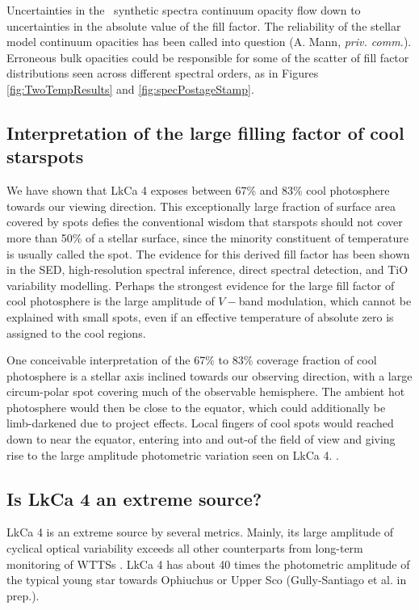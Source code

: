 \documentclass[twocolumn]{emulateapj}%
\newcommand{\name}{LkCa 4 }
\begin{document}
Uncertainties in the \PHOENIX\ synthetic spectra continuum opacity flow down to uncertainties in the absolute value of the fill factor.  The reliability of the stellar model continuum opacities has been called into question (A. Mann, \emph{priv. comm.}).  Erroneous bulk opacities could be responsible for some of the scatter of fill factor distributions seen across different spectral orders, as in Figures \ref{fig:TwoTempResults} and \ref{fig:specPostageStamp}.


\subsection{Interpretation of the large filling factor of cool starspots}
We have shown that LkCa 4 exposes between 67\% and 83\% cool photosphere towards our viewing direction.  This exceptionally large fraction of surface area covered by spots defies the conventional wisdom that starspots should not cover more than 50\% of a stellar surface, since the minority constituent of temperature is usually called the spot.  The evidence for this derived fill factor has been shown in the SED, high-resolution spectral inference, direct spectral detection, and TiO variability modelling.  Perhaps the strongest evidence for the large fill factor of cool photosphere is the large amplitude of $V-$band modulation, which cannot be explained with small spots, even if an effective temperature of absolute zero is assigned to the cool regions.

One conceivable interpretation of the 67\% to 83\% coverage fraction of cool photosphere is a stellar axis inclined towards our observing direction, with a large circum-polar spot covering much of the observable hemisphere.  The ambient hot photosphere would then be close to the equator, which could additionally be limb-darkened due to project effects.  Local fingers of cool spots would reached down to near the equator, entering into and out-of the field of view and giving rise to the large amplitude photometric variation seen on LkCa 4.  .

\subsection{Is \name an extreme source?}
LkCa 4 is an extreme source by several metrics.  Mainly, its large amplitude of cyclical optical variability exceeds all other counterparts from long-term monitoring of WTTSs \citep{grankin08}.  LkCa 4 has about 40 times the photometric amplitude of the typical young star towards Ophiuchus or Upper Sco (Gully-Santiago et al. in prep.).
\end{document}

